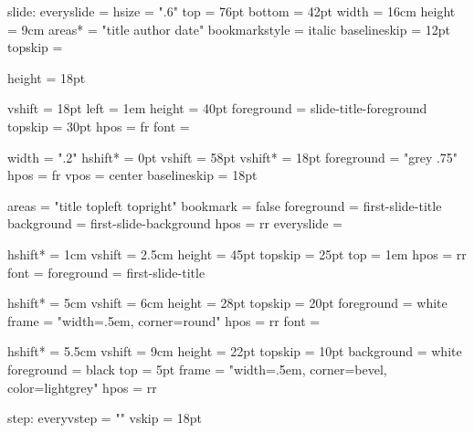 \setparameter slide:
  everyslide    = \everyslide
  hsize         = ".6\pdfpagewidth"
  top           = 76pt
  bottom        = 42pt
  width         = 16cm
  height        = 9cm
  areas*        = "title author date"
  bookmarkstyle = italic
  baselineskip  = 12pt
  topskip       = \baselineskip

\def\everyslide{%
  \position{titlebar}\slidetitle
}

%
% 

  height = 18pt

  vshift     = 18pt
  left       = 1em
  height     = 40pt
  foreground = slide-title-foreground
  topskip    = 30pt
  hpos       = fr
  font       = \slidetitlefont

  

%
%
  width      = ".2\pdfpagewidth"
  hshift*    = 0pt
  vshift     = 58pt
  vshift*    = 18pt
  foreground = "grey .75"
  hpos       = fr
  vpos       = center
  baselineskip = 18pt


%
%
  areas      = "title topleft topright"
  bookmark   = false
  foreground = first-slide-title
  background = first-slide-background
  hpos       = rr
  everyslide = {}

  hshift*    = 1cm
  vshift     = 2.5cm
  height     = 45pt
  topskip    = 25pt
  top        = 1em
  hpos       = rr
  font       = \maintitlefont
  foreground = first-slide-title

  hshift*    = 5cm
  vshift     = 6cm
  height     = 28pt
  topskip    = 20pt
  foreground = white
  frame      = "width=.5em, corner=round"
  hpos       = rr
  font       = \slidetitlefont
  
  hshift*    = 5.5cm
  vshift     = 9cm
  height     = 22pt
  topskip    = 10pt
  background = white
  foreground = black
  top        = 5pt
  frame      = "width=.5em, corner=bevel, color=lightgrey"
  hpos       = rr

%
%
\setparameter step:
  everyvstep = "\quitvmode\llap{\itemsymbol\kern.5em}"
  vskip = 18pt

\def\i{\vskip14pt\quitvmode\llap{\itemsymbol\kern.5em}}

